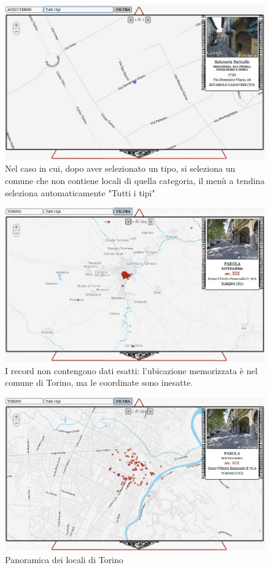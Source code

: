 \begin{figure}[ht!]
	\caption{Nel caso in cui, dopo aver selezionato un tipo, si seleziona un comune che non contiene locali di quella categoria, il men\`u a tendina seleziona automaticamente "Tutti i tipi"}
	\centering
		\includegraphics[width=\textwidth]{img/s10.jpg}
\end{figure}

\begin{figure}[ht!]
	\caption{I record non contengono dati esatti: l'ubicazione memorizzata \`e nel comune di Torino, ma le coordinate sono inesatte.}
	\centering
		\includegraphics[width=\textwidth]{img/s11.jpg}
\end{figure}

\begin{figure}[ht!]
	\caption{Panoramica dei locali di Torino}
	\centering
		\includegraphics[width=\textwidth]{img/s12.jpg}
\end{figure}


